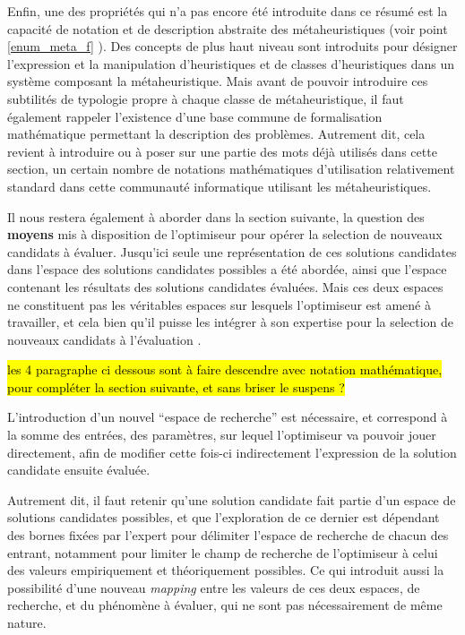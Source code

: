 Enfin, une des propriétés qui n'a pas encore été introduite dans ce résumé est la capacité de notation et de description abstraite des métaheuristiques (voir point \ref{enum_meta_f} ). Des concepts de plus haut niveau sont introduits pour désigner l'expression et la manipulation d'heuristiques et de classes d'heuristiques dans un système composant la métaheuristique. Mais avant de pouvoir introduire ces subtilités de typologie propre à chaque classe de métaheuristique, il faut également rappeler l'existence d'une base commune de formalisation mathématique permettant la description des problèmes. Autrement dit, cela revient à introduire ou à poser sur une partie des mots déjà utilisés dans cette section, un certain nombre de notations mathématiques d'utilisation relativement standard dans cette communauté informatique utilisant les métaheuristiques.

Il nous restera également à aborder dans la section suivante, la question des \textbf{moyens} mis à disposition de l'optimiseur pour opérer la selection de nouveaux candidats à évaluer. Jusqu'ici seule une représentation de ces solutions candidates dans l'espace des solutions candidates possibles a été abordée, ainsi que l'espace contenant les résultats des solutions candidates évaluées. Mais ces deux espaces ne constituent pas les véritables espaces sur lesquels l'optimiseur est amené à travailler, et cela bien qu'il puisse les intégrer à son expertise pour la selection de nouveaux candidats à l'évaluation .

\hl{les 4 paragraphe ci dessous sont à faire descendre avec notation mathématique, pour compléter la section suivante, et sans briser le suspens ?}

L'introduction d'un nouvel \enquote{espace de recherche} est nécessaire, et  correspond à la somme des entrées, des paramètres, sur lequel l'optimiseur va pouvoir jouer directement, afin de modifier cette fois-ci indirectement l'expression de la solution candidate ensuite évaluée.

Autrement dit, il faut retenir qu'une solution candidate fait partie d'un espace de solutions candidates possibles, et que l'exploration de ce dernier est dépendant des bornes fixées par l'expert pour délimiter l'espace de recherche de chacun des entrant, notamment pour limiter le champ de recherche de l'optimiseur à celui des valeurs empiriquement et théoriquement possibles. Ce qui introduit aussi la possibilité d'une nouveau \textit{mapping} entre les valeurs de ces deux espaces, de recherche, et du phénomène à évaluer, qui ne sont pas nécessairement de même nature.

